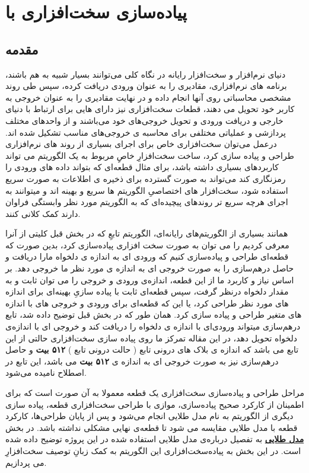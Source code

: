 \chapter{
	پیاده‌سازی سخت‌افزاری با
}

\section{
	مقدمه
}

دنیای نرم‌افزار و سخت‌افزار رایانه در نگاه کلی می‌توانند بسیار شبیه به هم باشند، برنامه های نرم‌افزاری، مقادیری را به عنوان ورودی دریافت کرده، سپس طی روند مشخصی محاسباتی روی آنها انجام داده و در نهایت مقادیری را به عنوان خروجی به کاربر خود تحویل می دهند، قطعات سخت‌افزاری نیز دارای 
هایی برای ارتباط با دنیای خارجی و دریافت ورودی‌ و تحویل خروجی‌های خود می‌باشند و از واحدهای مختلف پردازشی و عملیاتی مختلفی برای محاسبه ی خروجی‌های مناسب تشکیل شده اند. درعمل می‌توان سخت‌افزاری خاص برای اجرای بسیاری از روند های نرم‌افزاری طراحی و پیاده سازی کرد، ساخت سخت‌افزارِ خاصِِ مربوط به یک الگوریتم می تواند کاربرد‌های بسیاری داشته باشد، برای مثال قطعه‌ای که بتواند داده های ورودی را رمزنگاری کند می‌تواند به صورت گسترده برای ذخیره ی اطلاعات به صورت سریع استفاده شود، سخت‌افزار های اختصاصیِ الگوریتم ها سریع و بهینه اند و میتوانند به اجرای هرچه سریع تر روندهای پیچیده‌ای که به الگوریتم مورد نظر وابستگی فراوان دارند کمک کلانی کنند.

همانند بسیاری از الگوریتم‌های رایانه‌ای، الگوریتم تابعِ 
که در بخش قبل کلیتی از آنرا معرفی کردیم را می توان به صورت سخت افزاری پیاده‌سازی کرد، بدین صورت که قطعه‌ای طراحی و پیاده‌سازی کنیم که ورودی ای به اندازه ی دلخواه مارا دریافت و حاصل درهم‌سازی را به صورت خروجی ای به اندازه ی مورد نظر ما خروجی دهد. بر اساس نیاز و کاربرد ما از این قطعه، اندازه‌ی ورودی و خروجی را می توان ثابت و به مقدار دلخواه درنظر گرفت، سپس قطعه‌ای ثابت با پیاده سازیِ بهینه‌ای برای اندازه های مورد نظر طراحی کرد، یا این که قطعه‌ای  برای ورودی و خروجی های با اندازه های متغیر طراحی و پیاده سازی کرد. همان طور که در بخش قبل توضیح داده شد، تابع درهم‌سازی 
میتواند ورودی‌ای با اندازه ی دلخواه را دریافت کند و خروجی ای با اندازه‌ی دلخواه تحویل دهد، در این مقاله تمرکز ما روی پیاده سازی سخت‌افزاری حالتی از این تابع می باشد که اندازه ی بلاک های درونی تابع ( حالت درونی تابع ) 
\textbf{۵۱۲ بیت}
و حاصل درهم‌سازی نیز به صورت خروجی ای به اندازه ی 
\textbf{۵۱۲ بیت}
می باشد، این تابع در اصطلاح 
نامیده می‌شود.

مراحل طراحی و پیاده‌سازی سخت‌افزاری یک قطعه معمولا به آن صورت است که برای اطمینان از کارکرد صحیح پیاده‌سازی، موازی با طراحی سخت‌افزاری قطعه، پیاده سازی دیگری از الگوریتم به نام مدل طلایی انجام می‌شود و پس از پایان طراحی‌ها، کارکرد قطعه با مدل طلایی مقایسه می شود تا قطعه‌ی نهایی مشکلی نداشته باشد. در بخش 
\hyperref[chapter:GoldenModel]{\textbf{مدل طلایی}}
به تفصیل درباره‌ی مدل طلایی استفاده شده در این پروژه توضیح داده شده است. در این بخش به پیاده‌سخت‌افزاری این الگوریتم به کمک زبانِ توصیف سخت‌افزارِ 
می پردازیم.

